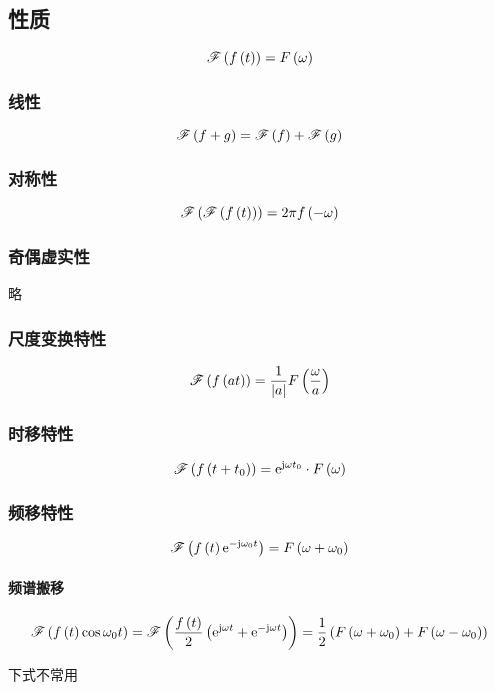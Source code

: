 \documentclass{article}
\begin{document}
\subsection{性质}

\[\fourier{\ft}=\fw\]

\subsubsection{线性}

\[\fourier{f+g}=\fourier f+\fourier g\]

\subsubsection{对称性}

\[\fourier{\fourier\ft}=2\pi f\pare{-\omega}\]

\subsubsection{奇偶虚实性}

略

\subsubsection{尺度变换特性}

\[\fourier{f\pare{at}}=\frac1{\abs a}F\pare{\frac\omega a}\]

\subsubsection{时移特性}

\[\fourier{f\pare{t+t_0}}=\e^{\j\omega t_0}\cdot \fw\]

\subsubsection{频移特性}

\[\fourier{\ft\e^{-\j\omega_0t}}=F\pare{\omega+\omega_0}\]

\paragraph{频谱搬移}

\[\fourier{\ft\cos\omega_0t}
    =\fourier{\frac\ft2\pare{\e^{\j\omega t}+\e^{-\j\omega t}}}
    =\frac12\pare{F\pare{\omega+\omega_0}+F\pare{\omega-\omega_0}}\]

下式不常用
\end{document}

